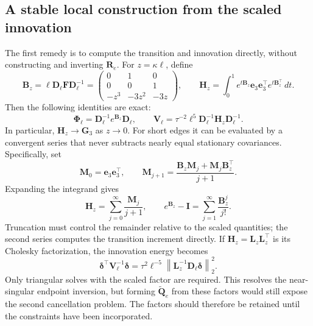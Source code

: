 \documentclass[11pt,a4paper]{article}
\theoremstyle{plain}
\theoremstyle{definition}
\begin{document}
\subsection{A stable local construction from the scaled innovation}
\label{sec:short_edge_local_solution}

The first remedy is to compute the transition and innovation directly,
without constructing and inverting $\mathbf R_e$. For $z=\kappa\ell$,
define
\begin{equation}
\mathbf B_z=\ell\mathbf D_\ell\mathbf F\mathbf D_\ell^{-1}
=\begin{pmatrix}0&1&0\\0&0&1\\-z^3&-3z^2&-3z\end{pmatrix},
\qquad
\mathbf H_z=\int_0^1e^{t\mathbf B_z}\mathbf e_3\mathbf e_3^\top
 e^{t\mathbf B_z^\top}\,dt.
\end{equation}
Then the following identities are exact:
\begin{equation}
\boldsymbol\Phi_\ell=\mathbf D_\ell^{-1}e^{\mathbf B_z}\mathbf D_\ell,
\qquad
\mathbf V_\ell=\tau^{-2}\ell^5
 \mathbf D_\ell^{-1}\mathbf H_z\mathbf D_\ell^{-1}.
\label{eq:short_edge_scaled_construction}
\end{equation}
In particular, $\mathbf H_z\to\mathbf G_3$ as $z\to0$.
For short edges it can be evaluated by a convergent series that never
subtracts nearly equal stationary covariances. Specifically, set
\begin{equation}
\mathbf M_0=\mathbf e_3\mathbf e_3^\top,\qquad
\mathbf M_{j+1}=\frac{\mathbf B_z\mathbf M_j+
 \mathbf M_j\mathbf B_z^\top}{j+1}.
\end{equation}
Expanding the integrand gives
\begin{equation}
\mathbf H_z=\sum_{j=0}^{\infty}\frac{\mathbf M_j}{j+1},
\qquad
e^{\mathbf B_z}-\mathbf I
=\sum_{j=1}^{\infty}\frac{\mathbf B_z^j}{j!}.
\label{eq:short_edge_series_solution}
\end{equation}
Truncation must control the remainder relative to the scaled quantities;
the second series computes the transition increment directly.
If $\mathbf H_z=\mathbf L_z\mathbf L_z^\top$ is its Cholesky
factorization, the innovation energy becomes
\begin{equation}
\boldsymbol\delta^\top\mathbf V_\ell^{-1}\boldsymbol\delta
=\tau^2\ell^{-5}
 \left\|\mathbf L_z^{-1}\mathbf D_\ell\boldsymbol\delta\right\|_2^2.
\label{eq:short_edge_whitened_innovation}
\end{equation}
Only triangular solves with the scaled factor are required. This
resolves the near-singular endpoint inversion, but forming
$\widetilde{\mathbf Q}_e$ from these factors would still expose the
second cancellation problem. The factors should therefore be retained
until the constraints have been incorporated.
\end{document}
